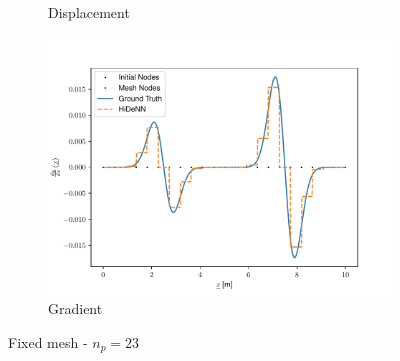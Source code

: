 \begin{figure}
\begin{subfigure}{0.3\linewidth}
        \caption{Displacement}
    \end{subfigure}
    \begin{subfigure}{0.3\linewidth}
        \centering
        \includegraphics[width=\linewidth]{Figures/Solution_gradients_Frozen.pdf}
        \caption{Gradient}
    \end{subfigure}
    \caption{Fixed mesh - $n_p=23$}
    \label{fig:Fixed Mesh23}
\end{figure}

